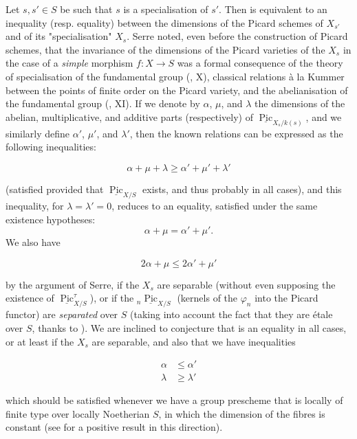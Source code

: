 \begin{remark}\label{fga3.vi-2-remark-2.8}
    Let $s,s'\in S$ be such that $s$ is a specialisation of $s'$.
    Then  is equivalent to an inequality (resp. equality) between the dimensions of the Picard schemes of $X_{s'}$ and of its "specialisation" $X_s$.
    Serre noted, even before the construction of Picard schemes, that the invariance of the dimensions of the Picard varieties of the $X_s$ in the case of a \emph{simple} morphism $f\colon X\to S$ was a formal consequence of the theory of specialisation of the fundamental group (\cite{Gro1960b}, X), classical relations à la Kummer between the points of finite order on the Picard variety, and the abelianisation of the fundamental group (\cite{Gro1960b}, XI).
    If we denote by $\alpha$, $\mu$, and $\lambda$ the dimensions of the abelian, multiplicative, and additive parts (respectively) of $\underline{\operatorname{Pic}}_{X_s/k(s)}$, and we similarly define $\alpha'$, $\mu'$, and $\lambda'$, then the known relations can be expressed as the following inequalities:

    \begin{equation}\tag{*}\label{fga3.vi-2-equation-star}
        \alpha+\mu+\lambda
        \geqslant \alpha'+\mu'+\lambda'
    \end{equation}

    (satisfied provided that $\underline{\operatorname{Pic}}_{X/S}$ exists, and thus probably in all cases), and this inequality, for $\lambda=\lambda'=0$, reduces to an equality, satisfied under the same existence hypotheses:
    \[
        \alpha+\mu = \alpha'+\mu'.
    \]
    We also have

    \begin{equation}\tag{**}\label{fga3.vi-2-equation-star-star}
        2\alpha+\mu \leqslant 2\alpha'+\mu'
    \end{equation}

    by the argument of Serre, if the $X_s$ are separable (without even supposing the existence of $\underline{\operatorname{Pic}}_{X/S}^\tau$), or if the ${}_n\underline{\operatorname{Pic}}_{X/S}$ (kernels of the $\varphi_n$ into the Picard functor) are \emph{separated} over $S$ (taking into account the fact that they are étale over $S$, thanks to ).
    We are inclined to conjecture that  is an equality in all cases, or at least if the $X_s$ are separable, and also that we have inequalities

    \begin{equation}\tag{***}\label{fga3.vi-2-equation-star-star-star}
        \begin{aligned}
            \alpha  & \leqslant \alpha'  \\
            \lambda & \geqslant \lambda'
        \end{aligned}
    \end{equation}

    which should be satisfied whenever we have a group prescheme that is locally of finite type over locally Noetherian $S$, in which the dimension of the fibres is constant (see  for a positive result in this direction).
\end{remark}

